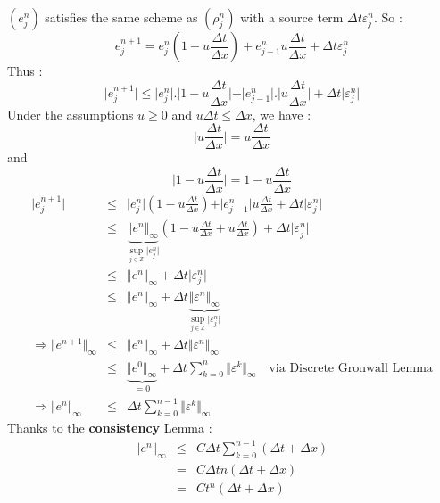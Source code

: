 \documentclass{report}
\theoremstyle{plain}
\theoremstyle{definition}
\theoremstyle{remark}
\begin{document}
$(e^n_j)$ satisfies the same scheme as $(\rho_j^n)$ with a source term $\Delta t \varepsilon_j^n$.
So : 
\begin{equation}
e_j^{n+1} = e_j^n \left(1 - u\frac{\Delta t}{\Delta x}\right) + e^n_{j-1} u\frac{\Delta t}{\Delta x} + \Delta t \varepsilon_j^n  
\end{equation}
Thus :
\begin{equation}
\vert e^{n+1}_j \vert \le \vert e^n_j \vert . \vert 1 - u\frac{\Delta t}{\Delta x} \vert  + \vert e^n_{j-1} \vert . \vert u\frac{\Delta t}{\Delta x} \vert + \Delta t \vert \varepsilon^n_j \vert
\end{equation}
Under the assumptions $u \ge 0$ and $u\Delta t \le \Delta x$, we have :
\begin{equation}
\vert u\frac{\Delta t}{\Delta x} \vert = u\frac{\Delta t}{\Delta x} 
\end{equation}
and
\begin{equation}
\vert 1-u\frac{\Delta t}{\Delta x} \vert= 1 - u\frac{\Delta t}{\Delta x}
\end{equation}
\begin{eqnarray}
\vert e^{n+1}_j \vert & \le & \vert e^{n}_j \vert \left(1 - u\frac{\Delta t}{\Delta x}\right) + \vert e^n_{j-1} \vert u\frac{\Delta t}{\Delta x} + \Delta t \vert \varepsilon_j^n \vert \\
&\le & \underbrace{\Vert e^n \Vert_\infty}_{\sup_{j \in \mathbb{Z}}\vert e^n_j \vert} \left(1 - u\frac{\Delta t}{\Delta x} + u\frac{\Delta t}{\Delta x} \right) + \Delta t \vert \varepsilon^n_j \vert \\
&\le & \Vert e^n \Vert_\infty + \Delta t \vert \varepsilon_j^n \vert \\
&\le & \Vert e^n \Vert_\infty + \Delta t \underbrace{\Vert \varepsilon^n \Vert_\infty}_{\sup_{j \in \mathbb{Z}}\vert \varepsilon^n_j \vert} \\
\Rightarrow  \Vert e^{n+1} \Vert_\infty &\le & \Vert e^n \Vert_\infty + \Delta t \Vert \varepsilon^n \Vert_\infty \\
& \le &  \underbrace{\Vert e^0 \Vert_\infty}_{=0} + \Delta t \sum_{k=0}^{n} \Vert \varepsilon^k \Vert_\infty \quad \text{via Discrete Gronwall Lemma} \\
\Rightarrow \Vert e^{n} \Vert_\infty & \le & \Delta t \sum_{k=0}^{n-1} \Vert \varepsilon^k \Vert_\infty
\end{eqnarray}
Thanks to the \textbf{consistency} Lemma : 
\begin{eqnarray}
\Vert e^n \Vert_\infty & \le & C \Delta t \sum_{k=0}^{n-1} (\Delta t + \Delta x) \\
&=& C\Delta t n (\Delta t + \Delta x) \\
&=& C t^n (\Delta t + \Delta x)
\end{eqnarray}
\end{document}
